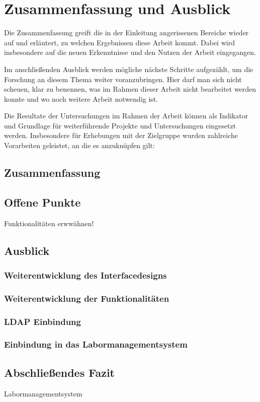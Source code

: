 
\chapter{Zusammenfassung und Ausblick}
\label{chapter-fazit}

Die Zusammenfassung greift die in der Einleitung angerissenen Bereiche wieder auf und erläutert, zu
welchen Ergebnissen diese Arbeit kommt. Dabei wird insbesondere auf die neuen Erkenntnisse und den
Nutzen der Arbeit eingegangen.

Im anschließenden Ausblick werden mögliche nächste Schritte aufgezählt, um die Forschung an diesem
Thema weiter voranzubringen. Hier darf man sich nicht scheuen, klar zu benennen, was im Rahmen
dieser Arbeit nicht bearbeitet werden konnte und wo noch weitere Arbeit notwendig ist.

Die Resultate der Untersuchungen im Rahmen der Arbeit können als Indikator und Grundlage für
weiterführende Projekte und Untersuchungen eingesetzt werden. Insbesondere für Erhebungen mit der
Zielgruppe wurden zahlreiche Vorarbeiten geleistet, an die es anzuknüpfen gilt:



\section{Zusammenfassung}

\section{Offene Punkte}
Funktionalitäten erwwähnen!

\section{Ausblick}

\subsection*{Weiterentwicklung des Interfacedesigns}

\subsection*{Weiterentwicklung der Funktionalitäten}
\subsection*{LDAP Einbindung}

\subsection*{Einbindung in das Labormanagementsystem}

\section{Abschließendes Fazit}

Labormanagementsystem
